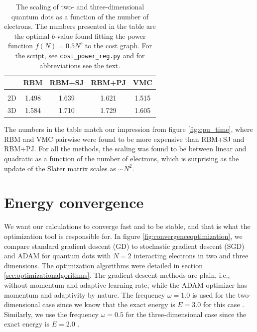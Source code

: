 \begin{table}
	\caption{The scaling of two- and three-dimensional quantum dots as a function of the number of electrons. The numbers presented in the table are the optimal $b$-value found fitting the power function $f(N)=0.5N^b$ to the cost graph. For the script, see \lstinline|cost_power_reg.py| and for abbreviations see the text.}
	\begin{tabularx}{\textwidth}{CCCCC} \hline\hline
		\label{tab:cputimefit}
		\makecell{\\ \phantom{=}} & RBM & RBM+SJ & RBM+PJ & VMC \\ \hline \\
		2D & 1.498 & 1.639 & 1.621 & 1.515 \\ 
		3D & 1.584 & 1.710 & 1.729 & 1.605 \\ \hline\hline
	\end{tabularx}
\end{table}

The numbers in the table match our impression from figure \eqref{fig:cpu_time}, where RBM and VMC pairwise were found to be more expensive than RBM+SJ and RBM+PJ. For all the methods, the scaling was found to be between linear and quadratic as a function of the number of electrons, which is surprising as the update of the Slater matrix scales as $\sim N^2$. 

\newpage
\section{Energy convergence}
We want our calculations to converge fast and to be stable, and that is what the optimization tool is responsible for. In figure \eqref{fig:convergenceoptimization}, we compare standard gradient descent (GD) to stochastic gradient descent (SGD) and ADAM for quantum dots with $N=2$ interacting electrons in two and three dimensions. The optimization algorithms were detailed in section \ref{sec:optimizationalgorithms}. The gradient descent methods are plain, i.e., without momentum and adaptive learning rate, while the ADAM optimizer has momentum and adaptivity by nature. The frequency $\omega=1.0$ is used for the two-dimensional case since we know that the exact energy is $E=3.0$ for this case \cite{taut_two_1993}. Similarly, we use the frequency $\omega=0.5$ for the three-dimensional case since the exact energy is $E=2.0$ \cite{taut_two_1994}. 

